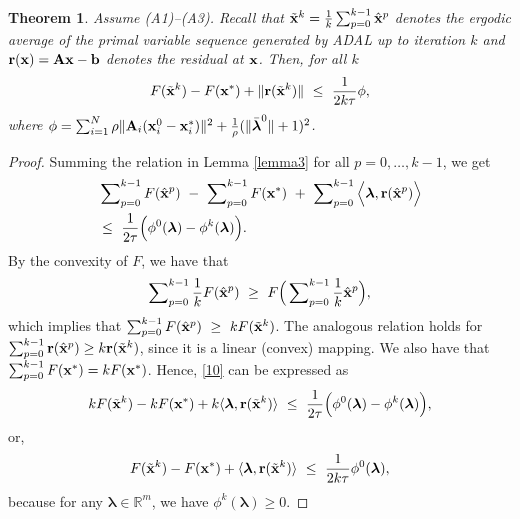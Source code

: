 \documentclass[doublecolumn]{IEEEtran}
\newtheorem{thm}{\bf \noindent Theorem}
\begin{document}
\begin{thm}\label{thm1}
Assume (A1)--(A3). Recall that ${ \tilde{\bf x} }^k = \frac{1}{k}\sum_{p=0}^{k-1} {\hat{\mathbf x}}^p $ denotes the ergodic average of the primal variable sequence generated by ADAL up to iteration $k$
and ${ {\bf r} }({ {\bf x} }) = { {\bf A} }{ {\bf x} } - { {\bf b} }$ denotes the residual at ${ {\bf x} }$.
Then, for all $k$
\begin{align}\label{thm_eq}
F({ \tilde{\bf x} }^k) -  F({ {\bf x} }^*) + \|{ {\bf r} }( { \tilde{\bf x} }^k)\| ~\leq~ \frac{1}{2k\tau} \phi,
\end{align}
where $\phi = \sum\nolimits_{i=1}^N {\rho}\|{ {\bf A} }_i({ {\bf x} }_i^0-{ {\bf x} }_i^*)\|^2 +\frac{1}{\rho}(\|\bar{\boldsymbol{\lambda}}^0\|+1)^2$.
\end{thm}
\begin{proof}
Summing the relation in Lemma \ref{lemma3} for all $p=0,\dots,k-1$, we get
\begin{align}\label{10}
& \sum\nolimits_{p=0}^{k-1}F(\hat{ {\bf x} }^p)  ~-~ \sum\nolimits_{p=0}^{k-1} F({ {\bf x} }^*) ~+~ \sum\nolimits_{p=0}^{k-1}\Big\langle {\boldsymbol{\lambda}}, { {\bf r} }({\hat{\mathbf x}}^p) \Big\rangle\notag\\
&  \leq~ \frac{1}{2\tau} \Big( \phi^0({\boldsymbol{\lambda}}) - \phi^{k}({\boldsymbol{\lambda}})\Big).
\end{align}
By the convexity of $F$, we have that
\begin{align*}
\sum\nolimits_{p=0}^{k-1}  \frac{1}{k} F(\hat{ {\bf x} }^p) ~\geq~  F \Big( \sum\nolimits_{p=0}^{k-1} \frac{1}{k}{\hat{\mathbf x}}^p \Big),
\end{align*}
which implies that $\sum\nolimits_{p=0}^{k-1}F(\hat{ {\bf x} }^p) ~\geq~  k F ( { \tilde{\bf x} }^k  )$. The analogous relation holds for $\sum_{p=0}^{k-1}{ {\bf r} }({\hat{\mathbf x}}^p) \geq k { {\bf r} }( { \tilde{\bf x} }^k  ) $, since it is a linear (convex) mapping. We also have that $\sum_{p=0}^{k-1} F({ {\bf x} }^*) = kF({ {\bf x} }^*)$. Hence, \eqref{10} can be expressed as
\begin{align*}
 kF( { \tilde{\bf x} }^k  )  - kF({ {\bf x} }^*) + k\langle {\boldsymbol{\lambda}}, { {\bf r} }( { \tilde{\bf x} }^k )\rangle~\leq~ \frac{1}{2\tau} \Big( \phi^0({\boldsymbol{\lambda}}) - \phi^{k}({\boldsymbol{\lambda}})\Big),
\end{align*}
or,
\begin{align}\label{eqn:ergodic}
 F( { \tilde{\bf x} }^k  ) - F({ {\bf x} }^*) + \langle {\boldsymbol{\lambda}}, { {\bf r} }( { \tilde{\bf x} }^k  )\rangle  ~\leq~ \frac{1}{2k\tau}   \phi^0({\boldsymbol{\lambda}}),
\end{align}
because for any ${\boldsymbol{\lambda}} \in \mathbb{R}^m$, we have $\phi^{k}({\boldsymbol{\lambda}}) \geq 0$.


\end{proof}
\end{document}
